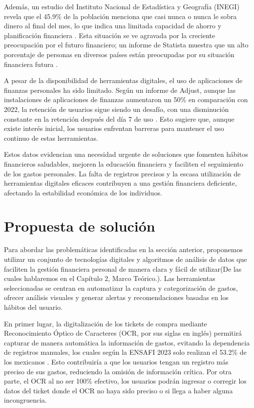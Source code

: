 Además, un estudio del Instituto Nacional de Estadística y Geografía (INEGI) revela que el 45.9\% de la población menciona que casi nunca o nunca le sobra dinero al final 
del mes, lo que indica una limitada capacidad de ahorro y planificación financiera \cite{inegi2024}. Esta situación se ve agravada por la creciente preocupación por el futuro financiero; 
un informe de Statista muestra que un alto porcentaje de personas en diversos países están preocupadas por su situación financiera futura \cite{statista2025}. 

A pesar de la disponibilidad de herramientas digitales, el uso de aplicaciones de finanzas personales ha sido limitado. Según un informe de Adjust, aunque las instalaciones 
de aplicaciones de finanzas aumentaron un 50\% en comparación con 2022, la retención de usuarios sigue siendo un desafío, con una disminución constante en la retención después 
del día 7 de uso \cite{adjust2023}.  Esto sugiere que, aunque existe interés inicial, los usuarios enfrentan barreras para mantener el uso continuo de estas herramientas. 

Estos datos evidencian una necesidad urgente de soluciones que fomenten hábitos financieros saludables, mejoren la educación financiera y faciliten el seguimiento de los gastos
personales. La falta de registros precisos y la escasa utilización de herramientas digitales eficaces contribuyen a una gestión financiera deficiente, afectando la estabilidad 
económica de los individuos. 

\section{Propuesta de solución}
Para abordar las problemáticas identificadas en la sección anterior, proponemos utilizar un conjunto de tecnologías digitales y algoritmos de análisis de datos que faciliten 
la gestión financiera personal de manera clara y fácil de utilizar(De las cuales hablaremos en el Capítulo 2, Marco Teórico.). Las herramientas seleccionadas se centran en automatizar la captura y categorización de gastos, ofrecer análisis 
visuales y generar alertas y recomendaciones basadas en los hábitos del usuario. 

En primer lugar, la digitalización de los tickets de compra mediante Reconocimiento Óptico de Caracteres (OCR, por sus siglas en inglés) permitirá capturar de manera automática 
la información de gastos, evitando la dependencia de registros manuales, los cuales según la ENSAFI 2023 solo realizan el 53.2\% de los mexicanos \cite{inegi2024}. Esto contribuiría a que 
los usuarios tengan un registro más preciso de sus gastos, reduciendo la omisión de información crítica. Por otra parte, el OCR al no ser 100\% efectivo, los usuarios podrán 
ingresar o corregir los datos del ticket donde el OCR no haya sido preciso o si llega a haber alguna incongruencia. 

